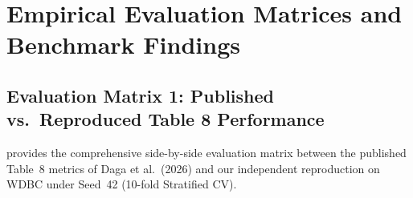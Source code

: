 \section{Empirical Evaluation Matrices and Benchmark Findings}
\label{sec:results-matrices}

\subsection{Evaluation Matrix 1: Published vs.\ Reproduced Table 8 Performance}
 provides the comprehensive side-by-side evaluation matrix between the published Table~8 metrics of Daga et al.\ (2026) and our independent reproduction on WDBC under Seed~42 (10-fold Stratified CV).

